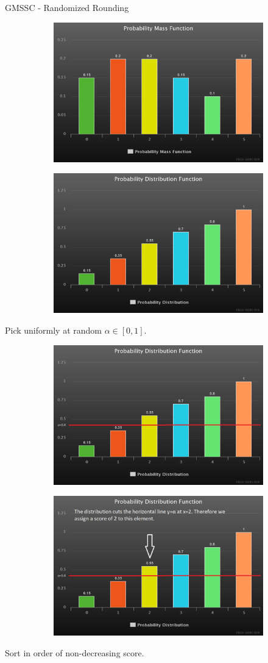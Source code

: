 \documentclass{beamer}
\begin{document}
\begin{frame}{GMSSC - Randomized Rounding}
    \begin{figure}
            \begin{subfigure}
                \centering
                \includegraphics[width=0.4\linewidth]{prob_mass.png}
                \label{fig:prob_mass}
            \end{subfigure}
            \begin{subfigure}
                \centering
                \includegraphics[width=0.4\linewidth]{prob_dist.png}
                \label{fig:prob_dist}
            \end{subfigure}
    \end{figure}
    
     Pick uniformly at random $\alpha \in [0,1]$.
    
    \begin{figure}
            \begin{subfigure}
                \centering
                \includegraphics[width=0.4\linewidth]{pick_a.png}
                \label{fig:horizontal_line}
            \end{subfigure}
            \begin{subfigure}
                \centering
                \includegraphics[width=0.4\linewidth]{pick_a_explain.png}
                \label{fig:ranking}
            \end{subfigure}
    \end{figure}
    
     Sort in order of non-decreasing score.
\end{frame}
\end{document}
